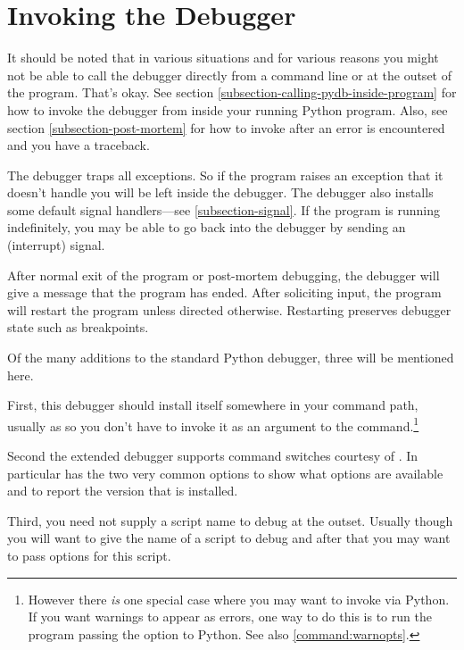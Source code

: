 \section{Invoking the Debugger \label{pydb-invocation}}

It should be noted that in various situations and for various reasons
you might not be able to call the debugger directly from a command
line or at the outset of the program. That's okay. See section
\ref{subsection-calling-pydb-inside-program} for how to invoke the
debugger from inside your running Python program. Also, see section
\ref{subsection-post-mortem} for how to invoke after an error is
encountered and you have a traceback. 

The debugger traps all exceptions. So if the program raises an
exception that it doesn't handle you will be left inside the
debugger. The debugger also installs some default signal
handlers---see \ref{subsection-signal}. If the program is running
indefinitely, you may be able to go back into the debugger by sending
an  (interrupt) signal.

After normal exit of the program or post-mortem debugging, the
debugger will give a message that the program has ended. After
soliciting input, the program will restart the program unless directed
otherwise.  Restarting preserves debugger state such as breakpoints.

Of the many additions to the standard Python debugger,
 three
will be mentioned here.

First, this debugger should install itself somewhere in your command
path, usually as  so you don't have to invoke it as an
argument to the  command.\footnote{However there
\emph{is} one special case where you may want to invoke via Python. If
you want warnings to appear as errors, one way to do this is
to run the  program passing the  option to
Python. See also \ref{command:warnopts}.}

Second the extended debugger supports command switches courtesy of
.
In particular  has the two very common options
 to show what options are available and 
to report the version that is installed. 

Third, you need not supply a script name to debug at the
outset. Usually though you will want to give the name of a script to
debug and after that you may want to pass options for this script.

